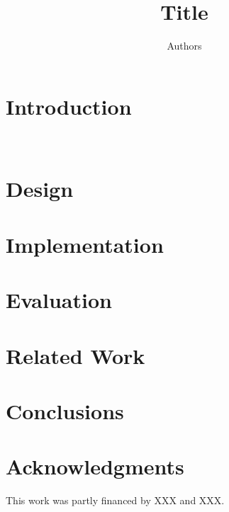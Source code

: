 \documentclass[]{IEEEtran}
\begin{document}
 \newlength{\figurewidth}
\setlength{\figurewidth}{0.7\textwidth}

\newcommand{\codesize}{\scriptsize}

\title{Title}

\author{Authors}

\maketitle


\begin{abstract}




\end{abstract}


\section{Introduction}


~\cite{dunkels04contiki}

\section{Design}
\label{sect:design}

\section{Implementation}
\label{sect:implementation}

\section{Evaluation}
\label{sect:evaluation}

\section{Related Work}
\label{sect:related}

\section{Conclusions}
\label{sect:conclusions}

\section*{Acknowledgments}
This work was partly financed by XXX and XXX.



\end{document}
